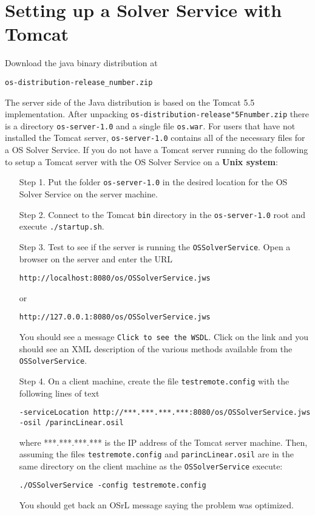 \documentclass[11pt]{article}
\renewcommand{\_}{{\char"5F}}
\renewcommand{\{}{{\char"7B}}
\renewcommand{\}}{{\char"7D}}
\renewcommand{\^}{{\char"0D}}
\renewcommand{\'}{{\char"0D}}
\begin{document}
\section{Setting up a Solver Service with Tomcat}\label{section:tomcat}

Download the java binary distribution at
\begin{verbatim}
os-distribution-release_number.zip
\end{verbatim}

The server side of the Java distribution is based on the Tomcat 5.5 implementation. After unpacking {\tt os-distribution-release\_number.zip} there is a directory {\tt os-server-1.0} and a single file {\tt os.war}.  For users that have not installed the Tomcat server,   {\tt os-server-1.0} contains  all of the necessary files for a OS Solver Service.  If you do not have a Tomcat server running do the following to setup a  Tomcat server  with the OS Solver Service on a {\bf Unix system}:

\begin{itemize}
\item[Step 1.]  Put the folder  {\tt os-server-1.0}   in the desired location for the OS Solver Service on the server machine.

\item[Step 2.] Connect to the Tomcat {\tt bin} directory in the {\tt os-server-1.0} root and execute {\tt ./startup.sh}.

\item[Step 3.] Test to see if the server is running the {\tt OSSolverService}.  Open a browser on the server and enter the URL
\begin{verbatim}
http://localhost:8080/os/OSSolverService.jws
\end{verbatim}
or
\begin{verbatim}
http://127.0.0.1:8080/os/OSSolverService.jws
\end{verbatim}
You should see a message {\tt Click to see the WSDL}.  Click on the link and you should see an XML description of the various methods available from the {\tt OSSolverService}.

\item[Step 4.]  On a client machine, create  the file {\tt testremote.config} with the following lines of text
\begin{verbatim}
-serviceLocation http://***.***.***.***:8080/os/OSSolverService.jws
-osil /parincLinear.osil
\end{verbatim}
where ***.***.***.*** is the IP address of the Tomcat server machine. Then, assuming the files {\tt testremote.config} and {\tt parincLinear.osil} are in the same directory on the client machine as the {\tt OSSolverService} execute:
\begin{verbatim}
./OSSolverService -config testremote.config
\end{verbatim}
You should get back an OSrL message saying the problem was optimized.

\end{itemize}
\end{document}

